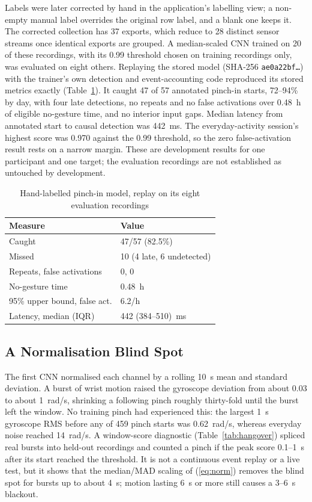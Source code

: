 Labels were later corrected by hand in the application's labelling view; a non-empty manual label overrides the original row label, and a blank one keeps it. The corrected collection has 37 exports, which reduce to 28 distinct sensor streams once identical exports are grouped. A median-scaled CNN trained on 20 of these recordings, with its 0.99 threshold chosen on training recordings only, was evaluated on eight others. Replaying the stored model (SHA-256 \texttt{ae0a22bf\ldots}) with the trainer's own detection and event-accounting code reproduced its stored metrics exactly (Table~\ref{tab:hand}). It caught 47 of 57 annotated pinch-in starts, 72--94\% by day, with four late detections, no repeats and no false activations over 0.48~h of eligible no-gesture time, and no interior input gaps. Median latency from annotated start to causal detection was 442~ms. The everyday-activity session's highest score was 0.970 against the 0.99 threshold, so the zero false-activation result rests on a narrow margin. These are development results for one participant and one target; the evaluation recordings are not established as untouched by development.

\begin{table}[t]
  \centering
  \caption{Hand-labelled pinch-in model, replay on its eight evaluation recordings}
  \label{tab:hand}
  \small
  \begin{tabular}{@{}ll@{}}
    \toprule
    Measure & Value \\
    \midrule
    Caught & 47/57 (82.5\%) \\
    Missed & 10 (4 late, 6 undetected) \\
    Repeats, false activations & 0, 0 \\
    No-gesture time & 0.48~h \\
    95\% upper bound, false act. & 6.2/h \\
    Latency, median (IQR) & 442 (384--510)~ms \\
    \bottomrule
  \end{tabular}
\end{table}

\subsection{A Normalisation Blind Spot}\label{sec:blind}

The first CNN normalised each channel by a rolling 10~s mean and standard deviation. A burst of wrist motion raised the gyroscope deviation from about 0.03 to about 1~rad/s, shrinking a following pinch roughly thirty-fold until the burst left the window. No training pinch had experienced this: the largest 1~s gyroscope RMS before any of 459 pinch starts was 0.62~rad/s, whereas everyday noise reached 14~rad/s. A window-score diagnostic (Table~\ref{tab:hangover}) spliced real bursts into held-out recordings and counted a pinch if the peak score 0.1--1~s after its start reached the threshold. It is not a continuous event replay or a live test, but it shows that the median/MAD scaling of (\ref{eq:norm}) removes the blind spot for bursts up to about 4~s; motion lasting 6~s or more still causes a 3--6~s blackout.

